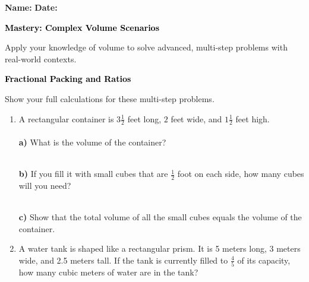 \documentclass[12pt, letterpaper, fleqn]{article}
\begin{document}
\textbf{Name:} \underline{\hspace{5cm}}
\hfill
\textbf{Date:} \underline{\hspace{3cm}}\\

\begin{tcolorbox}[colback=black!10]
    \large\textcolor{black}{\textbf{Mastery: Complex Volume Scenarios}}
\end{tcolorbox}

\vspace{3mm}

\noindent
Apply your knowledge of volume to solve advanced, multi-step problems with real-world contexts.

\vspace{4mm}

\begin{tcolorbox}[colback=black!10]
\large\textcolor{black}{\textbf{Fractional Packing and Ratios}}
\end{tcolorbox}

\noindent
Show your full calculations for these multi-step problems.

\vspace{3mm}

\begin{enumerate}[itemsep=1cm, leftmargin=0.6cm]

\item A rectangular container is $3\frac{1}{2}$ feet long, $2$ feet wide, and $1\frac{1}{2}$ feet high.\\ \\
\textbf{a)} What is the volume of the container?  \\ \\
\vspace{0.5cm}

\textbf{b)} If you fill it with small cubes that are $\frac{1}{2}$ foot on each side, how many cubes will you need? \\ \\
\vspace{0.5cm}

\textbf{c)} Show that the total volume of all the small cubes equals the volume of the container. 

\vspace{0.5cm}

\item A water tank is shaped like a rectangular prism. It is 5 meters long, 3 meters wide, and 2.5 meters tall. If the tank is currently filled to $\frac{4}{5}$ of its capacity, how many cubic meters of water are in the tank? 
\vspace{1cm}

\end{enumerate}
\end{document}
